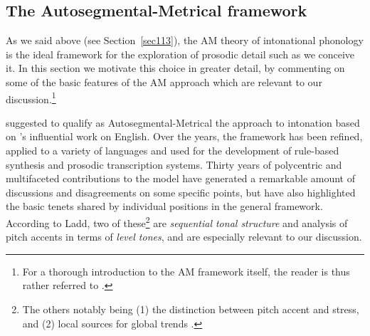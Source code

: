 \subsection{The Autosegmental-Metrical framework}\label{sec122}
As we said above (see Section~\ref{sec113}), the AM theory of intonational phonology is the ideal framework for the exploration of prosodic detail such as we conceive it. In this section we motivate this choice in greater detail, by commenting on some of the basic features of the AM approach which are relevant to our discussion.\footnote{For a thorough introduction to the AM framework itself, the reader is thus rather referred to \citet{shattuck1996prosody,gussenhoven2004phonology,ladd1996intonational,ladd2008intonational}.}

\citet{ladd1996intonational} suggested to qualify as Autosegmental-Metrical the approach to intonation based on \citeauthor{pierrehumbert1980phonology}'s \citeyearpar{pierrehumbert1980phonology} influential work on English. Over the years, the framework has been refined, applied to a variety of languages and used for the development of rule-based synthesis and prosodic transcription systems. Thirty years of polycentric and multifaceted contributions to the model have generated a remarkable amount of discussions and disagreements on some specific points, but have also highlighted the basic tenets shared by individual positions in the general framework. According to Ladd, two of these\footnote{The others notably being (1) the distinction between pitch accent and stress, and (2) local sources for global trends \cite[44, which is the source for the other quotes in this section, unless otherwise specified]{ladd2008intonational}.} are \textit{sequential tonal structure} and analysis of pitch accents in terms of \textit{level tones}, and are especially relevant to our discussion.

